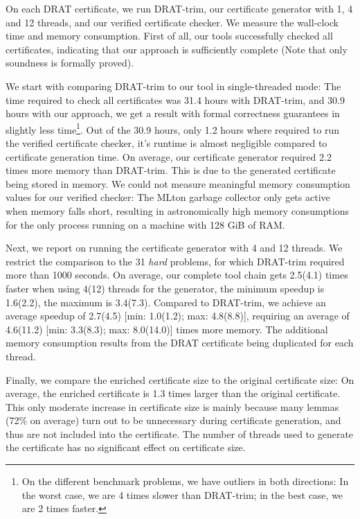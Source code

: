 \documentclass{llncs}
\begin{document}
On each DRAT certificate, we run DRAT-trim, our certificate generator with 1, 4 and 12 threads, and our verified certificate checker. 
We measure the wall-clock time and memory consumption. First of all, our tools successfully checked all certificates, indicating that our approach is sufficiently complete (Note that only soundness is formally proved). 

We start with comparing DRAT-trim to our tool in single-threaded mode: The time required to check all certificates was 31.4 hours with DRAT-trim, and 30.9 hours with our approach, \ie we 
get a result with formal correctness guarantees in slightly less time\footnote{On the different benchmark problems, we have outliers in both directions: In the worst case, we are 4 times slower than DRAT-trim; in the best case, we are 2 times faster.}. Out of the 30.9 hours, only 1.2 hours where required to run the verified certificate checker, \ie it's runtime is almost negligible compared to certificate generation time. On average, our certificate generator required 2.2 times more memory than DRAT-trim. This is due to the generated certificate being stored 
in memory. We could not measure meaningful memory consumption values for our verified checker: The MLton garbage collector only gets active when memory falls short, 
resulting in astronomically high memory consumptions for the only process running on a machine with 128 GiB of RAM.

Next, we report on running the certificate generator with 4 and 12 threads. 
We restrict the comparison to the 31 \emph{hard} problems, for which DRAT-trim required more than 1000 seconds.
On average, our complete tool chain gets 2.5(4.1) times faster when using 4(12) threads for the generator, the minimum speedup is 1.6(2.2), the maximum is 3.4(7.3).
Compared to DRAT-trim, we achieve an average speedup of 2.7(4.5) [min: 1.0(1.2); max: 4.8(8.8)], requiring an average of 4.6(11.2) [min: 3.3(8.3); max: 8.0(14.0)] times more memory.
The additional memory consumption results from the DRAT certificate being duplicated for each thread.

Finally, we compare the enriched certificate size to the original certificate size: On average, the enriched certificate is 1.3 times larger than the original certificate. This only moderate increase in certificate size is mainly because many lemmas (72\% on average) turn out to be unnecessary during 
certificate generation, and thus are not included into the certificate. The number of threads used to generate the certificate has no significant effect on certificate size.
\end{document}
